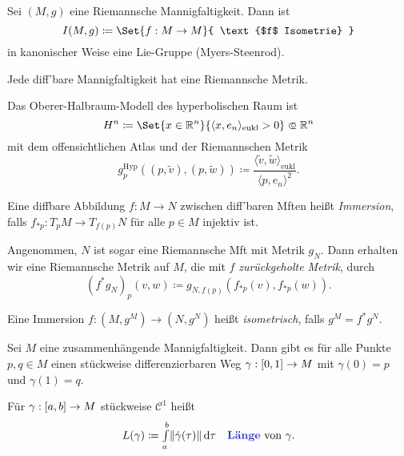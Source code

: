 \documentclass{cheat-sheet}
\begin{document}
\begin{defn}
  Sei $(M, g)$ eine Riemannsche Mannigfaltigkeit. Dann ist
  \[ I(M, g) \coloneqq \Set{ f : M \to M }{ \text{$f$ Isometrie} } \]
  in kanonischer Weise eine Lie-Gruppe (Myers-Steenrod).
\end{defn}

\begin{satz}
  Jede diff'bare Mannigfaltigkeit hat eine Riemannsche Metrik.
\end{satz}

\begin{bsp}
  Das Oberer-Halbraum-Modell des hyperbolischen Raum ist
  \[ H^n \coloneqq \Set{x \in \R^n}{\langle x, e_n \rangle_{\text{eukl}} > 0} \opn \R^n \]
  mit dem offensichtlichen Atlas und der Riemannschen Metrik
  \[ g_p^{\text{Hyp}} ((p, \tilde{v}), (p, \tilde{w})) \coloneqq \frac{\langle \tilde{v}, \tilde{w} \rangle_{\text{eukl}}}{\langle p, e_n \rangle^2}. \]
\end{bsp}

\begin{defn}
  Eine diffbare Abbildung $f : M \to N$ zwischen diff'baren Mften heißt \emph{Immersion}, falls $f_{*p} : T_p M \to T_{f(p)} N$ für alle $p \in M$ injektiv ist.
\end{defn}

\begin{defn}
  Angenommen, $N$ ist sogar eine Riemannsche Mft mit Metrik $g_N$. Dann erhalten wir eine Riemannsche Metrik auf $M$, die mit $f$ \emph{zurückgeholte Metrik}, durch
  \[ (f^* g_N)_p (v, w) \coloneqq g_{N,f(p)}(f_{*p}(v), f_{*p}(w)). \]
\end{defn}

\begin{defn}
  Eine Immersion $f : (M, g^M) \to (N, g^N)$ heißt \emph{isometrisch}, falls $g^M = f^* g^N$.
\end{defn}

\begin{prop}
  Sei $M$ eine zusammenhängende Mannigfaltigkeit. Dann gibt es für alle Punkte $p, q \in M$ einen stückweise differenzierbaren Weg $\gamma : \left[ 0, 1 \right] \to M$ mit $\gamma(0) = p$ und $\gamma(1) = q$.
\end{prop}

\begin{defn}
  Für $\gamma : \left[ a, b \right] \to M$ stückweise $\mathcal{C}^1$ heißt
  \[
    L(\gamma) \coloneqq \Int{a}{b}{\norm{\dot{\gamma}(\tau)}}{\tau}
    \quad \text{\emph{Länge} von $\gamma$.}
  \]
\end{defn}
\end{document}
